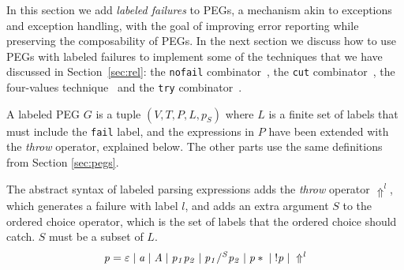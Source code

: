 \documentclass[3p,12pt,singlecolumn]{elsarticle}
\newcommand{\throw}{\Uparrow}
\begin{document}
In this section we add \emph{labeled failures} to PEGs,
a mechanism akin to exceptions and exception handling,
with the goal of improving error reporting while preserving
the composability of PEGs. In the next section we discuss how to use PEGs with labeled
failures to implement some of
the techniques that we have discussed in Section~\ref{sec:rel}: 
the \texttt{nofail} combinator~\cite{hutton1992hfp},
the \texttt{cut} combinator~\cite{rojemo1995epc},
the four-values technique~\cite{partridge1996fv} and
the \texttt{try} combinator~\cite{leijen2001parsec}.

A labeled PEG $G$ is a tuple $(V,T,P,L,p_{S})$ where
$L$ is a finite set of labels that must include the {\tt fail}
label, and the
expressions in $P$ have been extended with the {\em throw}
operator, explained below. The other parts use the same definitions from Section \ref{sec:pegs}. 

The abstract syntax of labeled parsing expressions adds the
\emph{throw} operator $\throw^{l}$, which generates a failure
with label $l$, and adds an extra argument $S$ to the ordered choice
operator, which is the set of labels that the ordered choice should
catch. $S$ must be a subset of $L$.
\[\it{
p = \varepsilon \; | \; a \; | \; A \; | \; p_1 p_2 \; | \;
  p_1 /^{S} p_2 \; | \; p* \; | \; !p \; | \; \throw^{l}
}\]
\end{document}
